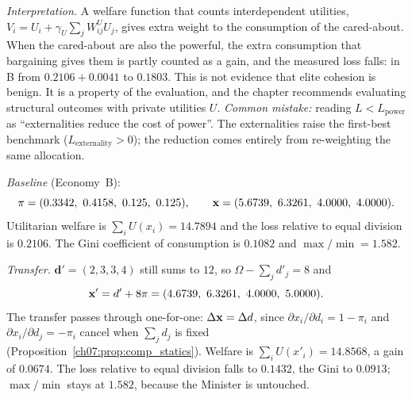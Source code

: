 \documentclass[../solutions_manual.tex]{subfiles}
\begin{document}
\emph{Interpretation.} A welfare function that counts interdependent utilities, $V_i = U_i + \gamma_U\sum_{j}W^U_{ij}U_j$, gives extra weight to the consumption of the cared-about. When the cared-about are also the powerful, the extra consumption that bargaining gives them is partly counted as a gain, and the measured loss falls: in B from $0.2106 + 0.0041$ to $0.1803$. This is not evidence that elite cohesion is benign. It is a property of the evaluation, and the chapter recommends evaluating structural outcomes with private utilities $U$. \emph{Common mistake:} reading $L < L_{\text{power}}$ as ``externalities reduce the cost of power''. The externalities raise the first-best benchmark ($L_{\text{externality}} > 0$); the reduction comes entirely from re-weighting the same allocation.


\emph{Baseline} (Economy~B):
\[
\boldsymbol{\pi} = (0.3342,\ 0.4158,\ 0.125,\ 0.125), \qquad \x = (5.6739,\ 6.3261,\ 4.0000,\ 4.0000).
\] Utilitarian welfare is $\sum_iU(x_i) = 14.7894$ and the loss relative to equal division is $0.2106$. The Gini coefficient of consumption is $0.1082$ and $\max/\min = 1.582$.

 \emph{Transfer.} $\boldsymbol{d}' = (2, 3, 3, 4)$ still sums to $12$, so $\Omega - \sum_j d'_j = 8$ and
\[
\mathbf{x}' = d' + 8\pi = (4.6739,\ 6.3261,\ 4.0000,\ 5.0000).
\]
The transfer passes through one-for-one: $\Delta\mathbf{x} = \Delta d$, since $\partial x_i/\partial d_i = 1 - \pi_i$ and $\partial x_i/\partial d_j = -\pi_i$ cancel when $\sum_j d_j$ is fixed (Proposition~\ref{ch07:prop:comp_statics}). Welfare is $\sum_iU(x'_i) = 14.8568$, a gain of $0.0674$. The loss relative to equal division falls to $0.1432$, the Gini to $0.0913$; $\max/\min$ stays at $1.582$, because the Minister is untouched.
\end{document}
